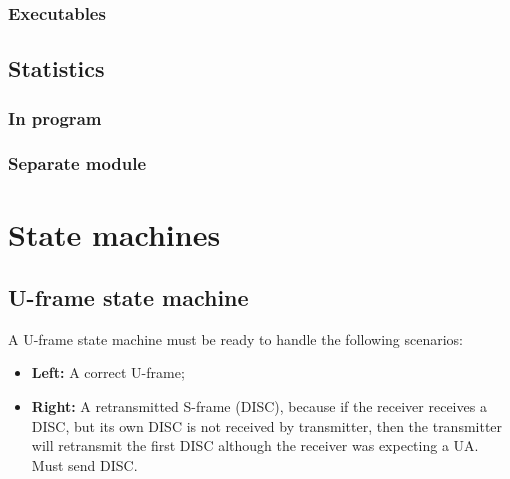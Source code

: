 \documentclass[a4paper, 11pt]{report}
\begin{document}
\subsection{Executables}



\section{Statistics}
\subsection{In program}



\subsection{Separate module}




\restoregeometry

\chapter{State machines}
\section{U-frame state machine}

A U-frame state machine must be ready to handle the following scenarios:
\begin{itemize}
	\item \textbf{Left:} A correct U-frame;
	\item \textbf{Right:} A retransmitted S-frame (DISC), because if the receiver receives a DISC, but its own DISC is not received by transmitter, then the transmitter will retransmit the first DISC although the receiver was expecting a UA. Must send DISC.
\end{itemize}
\end{document}
